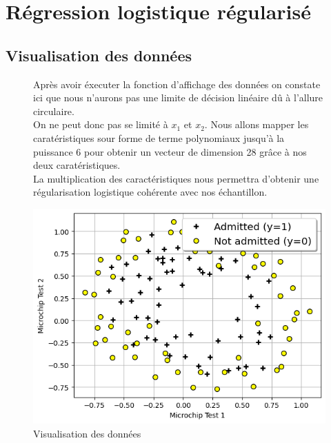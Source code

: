 \clearpage
\section{Régression logistique régularisé}

\subsection{Visualisation des données}
\begin{figure}[!h]
    \begin{minipage}{.48\linewidth}
        Après avoir éxecuter la fonction d'affichage des données on constate ici que nous n'aurons pas une limite de décision linéaire dû à l'allure circulaire. \\
        On ne peut donc pas se limité à $x_1$ et $x_2$. Nous allons mapper les caratéristiques sour forme de terme polynomiaux jusqu'à la puissance 6 pour obtenir un 
        vecteur de dimension 28 grâce à nos deux caratéristiques. \\
        La multiplication des caractéristiques nous permettra d'obtenir une régularisation logistique cohérente avec nos échantillon.

    \end{minipage}\hfill
    \begin{minipage}{.48\linewidth}
        \begin{center}
            \includegraphics[width=1\textwidth]{./img/4.1.png}
            \caption{\label{fig:4.1}Visualisation des données}  
        \end{center}
    \end{minipage}
\end{figure}

